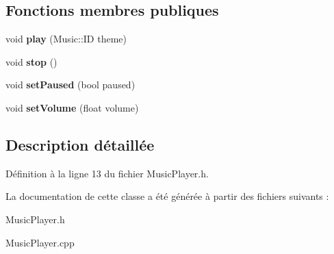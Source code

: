 \subsection*{Fonctions membres publiques}
\begin{DoxyCompactItemize}
\item 
\hypertarget{class_music_player_a8a10a649154c8b7af3031c5f36cb53ca}{}\label{class_music_player_a8a10a649154c8b7af3031c5f36cb53ca} 
void {\bfseries play} (Music\+::\+ID theme)
\item 
\hypertarget{class_music_player_a54e47a9e937730493d886aa5624c44d1}{}\label{class_music_player_a54e47a9e937730493d886aa5624c44d1} 
void {\bfseries stop} ()
\item 
\hypertarget{class_music_player_a59b313a9a9eb850e590f9c6555ad80cf}{}\label{class_music_player_a59b313a9a9eb850e590f9c6555ad80cf} 
void {\bfseries set\+Paused} (bool paused)
\item 
\hypertarget{class_music_player_a361cbcbfb31d3c0c841d0b67a79c5cdd}{}\label{class_music_player_a361cbcbfb31d3c0c841d0b67a79c5cdd} 
void {\bfseries set\+Volume} (float volume)
\end{DoxyCompactItemize}


\subsection{Description détaillée}


Définition à la ligne 13 du fichier Music\+Player.\+h.



La documentation de cette classe a été générée à partir des fichiers suivants \+:\begin{DoxyCompactItemize}
\item 
Music\+Player.\+h\item 
Music\+Player.\+cpp\end{DoxyCompactItemize}
